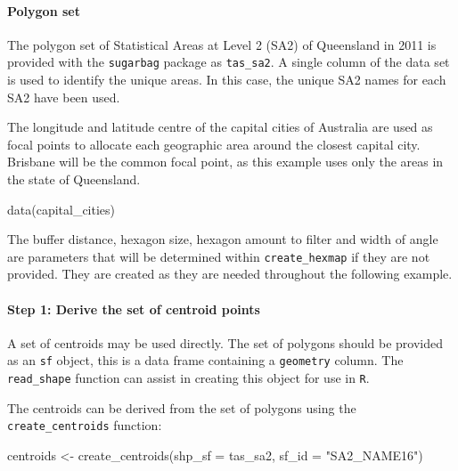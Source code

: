 \hypertarget{polygon-set}{%
\paragraph{Polygon set}\label{polygon-set}}

The polygon set of Statistical Areas at Level 2 (SA2) \citep{abs2011} of
Queensland in 2011 is provided with the \texttt{sugarbag} package as
\texttt{tas\_sa2}. A single column of the data set is used to identify
the unique areas. In this case, the unique SA2 names for each SA2 have
been used.

The longitude and latitude centre of the capital cities of Australia are
used as focal points to allocate each geographic area around the closest
capital city. Brisbane will be the common focal point, as this example
uses only the areas in the state of Queensland.

\begin{Schunk}
\begin{Sinput}
data(capital_cities)
\end{Sinput}
\end{Schunk}

The buffer distance, hexagon size, hexagon amount to filter and width of
angle are parameters that will be determined within
\texttt{create\_hexmap} if they are not provided. They are created as
they are needed throughout the following example.

\hypertarget{step-1-derive-the-set-of-centroid-points}{%
\paragraph{Step 1: Derive the set of centroid
points}\label{step-1-derive-the-set-of-centroid-points}}

A set of centroids may be used directly. The set of polygons should be
provided as an \texttt{sf} object, this is a data frame containing a
\texttt{geometry} column. The \texttt{read\_shape} function can assist
in creating this object for use in \texttt{R}.

The centroids can be derived from the set of polygons using the
\texttt{create\_centroids} function:

\begin{Schunk}
\begin{Sinput}
centroids <- create_centroids(shp_sf = tas_sa2, sf_id = "SA2_NAME16")
\end{Sinput}
\end{Schunk}

